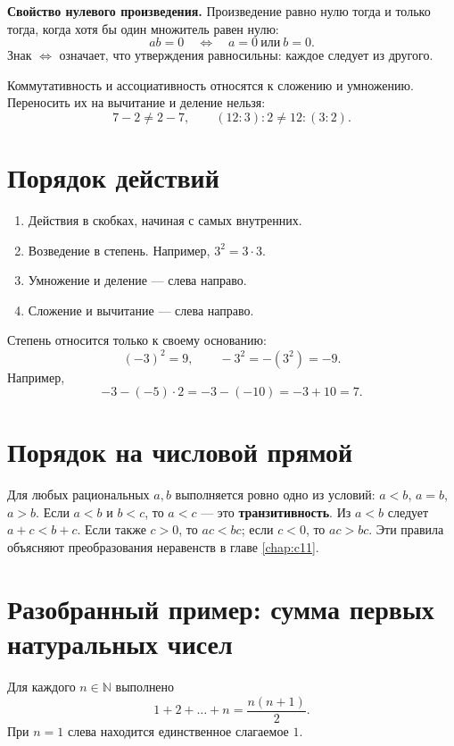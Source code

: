 \textbf{Свойство нулевого произведения.}
Произведение равно нулю тогда и только тогда, когда хотя бы один множитель равен нулю:
\[
ab=0\quad\Longleftrightarrow\quad a=0\ \text{или}\ b=0.
\]
Знак \(\Longleftrightarrow\) означает, что утверждения равносильны: каждое следует из другого.

Коммутативность и ассоциативность относятся к сложению и умножению.
Переносить их на вычитание и деление нельзя:
\[
7-2\ne2-7,\qquad (12:3):2\ne12:(3:2).
\]

\section{Порядок действий}

\begin{enumerate}[label=\arabic*.,leftmargin=2em,itemsep=3pt]
\item Действия в скобках, начиная с самых внутренних.
\item Возведение в степень. Например, \(3^2=3\cdot3\).
\item Умножение и деление --- слева направо.
\item Сложение и вычитание --- слева направо.
\end{enumerate}

Степень относится только к своему основанию:
\[
(-3)^2=9,\qquad -3^2=-(3^2)=-9.
\]
Например,
\[
-3-(-5)\cdot2=-3-(-10)=-3+10=7.
\]

\section{Порядок на числовой прямой}
Для любых рациональных \(a,b\) выполняется ровно одно из условий: \(a<b\), \(a=b\), \(a>b\).
Если \(a<b\) и \(b<c\), то \(a<c\) — это \textbf{транзитивность}.
Из \(a<b\) следует \(a+c<b+c\). Если также \(c>0\), то \(ac<bc\); если \(c<0\), то \(ac>bc\).
Эти правила объясняют преобразования неравенств в главе \ref{chap:c11}.
\Needspace{.85\textheight}
\section{Разобранный пример: сумма первых натуральных чисел}

\begin{theorem}\label{thm:legacy-c01-3}
Для каждого \(n\in\mathbb N\) выполнено
\[
1+2+\dots+n=\frac{n(n+1)}2.
\]
При \(n=1\) слева находится единственное слагаемое \(1\).
\end{theorem}

